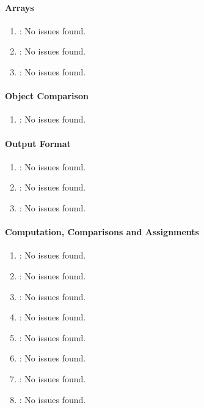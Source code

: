 \paragraph{Arrays} %
\label{par:arrays}

\begin{enumerate} [resume]
	\item \emph{\checkAK}: No issues found.
	\item \emph{\checkAL}: No issues found.
	\item \emph{\checkAM}: No issues found.
\end{enumerate}

\paragraph{Object Comparison} %
\label{par:object_comparison}

\begin{enumerate} [resume]
	\item \emph{\checkAN}: No issues found.
\end{enumerate}

\paragraph{Output Format} %
\label{par:output_format}

\begin{enumerate} [resume]
	\item \emph{\checkAO}: No issues found.
	\item \emph{\checkAP}: No issues found.
	\item \emph{\checkAQ}: No issues found.
\end{enumerate}

\paragraph{Computation, Comparisons and Assignments} %
\label{par:computation_comparisons_and_assignments}

\begin{enumerate} [resume]
	\item \emph{\checkAR}: No issues found.
	\item \emph{\checkAS}: No issues found.
	\item \emph{\checkAT}: No issues found.
	\item \emph{\checkAU}: No issues found.
	\item \emph{\checkAV}: No issues found.
	\item \emph{\checkAW}: No issues found.
	\item \emph{\checkAX}: No issues found.
	\item \emph{\checkAY}: No issues found.
\end{enumerate}

